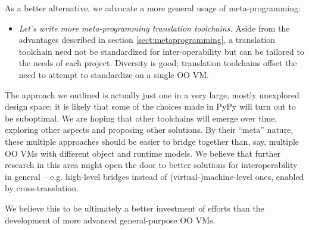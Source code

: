 \documentclass{llncs}
\begin{document}
\noindent
As a better alternative, we advocate a more general usage of
meta-programming:

\begin{itemize}
\item \emph{Let's write more meta-programming translation toolchains.}
Aside from the advantages described in section
\ref{sect:metaprogramming}, a translation toolchain need not be
standardized for inter-operability but can be tailored to the needs of
each project.  Diversity is good; translation toolchains offset the need
to attempt to standardize on a single OO VM.
\end{itemize}

The approach we outlined is actually just one in a very large, mostly
unexplored design space; it is likely that some of the choices made in
PyPy will turn out to be suboptimal.  We are hoping that other
toolchains will emerge over time, exploring other aspects and proposing
other solutions.  By their ``meta'' nature, these multiple approaches
should be easier to bridge together than, say, multiple OO VMs with
different object and runtime models.  We believe that further research
in this area might open the door to better solutions for
interoperability in general -- e.g. high-level bridges instead of
(virtual-)machine-level ones, enabled by cross-translation.

We believe this to be ultimately a better investment of efforts than the
development of more advanced general-purpose OO VMs.




\end{document}
